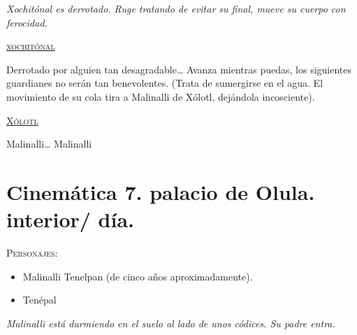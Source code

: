 \documentclass[11pt,letterpaper]{article}
\begin{document}
\textit{Xochitónal es derrotado. Ruge tratando de evitar su final, mueve su cuerpo con ferocidad. }

\begin{center}
\textsc{\underline{xochitónal}}
\\
\par
Derrotado por alguien tan desagradable… Avanza mientras puedas, los siguientes guardianes no serán tan benevolentes. (Trata de sumergirse en el agua. El movimiento de su cola tira a Malinalli de Xólotl, dejándola incosciente).
\\
\par
\textsc{\underline{Xólotl}}
\\
\par
Malinalli… Malinalli
\end{center}

\section{Cinemática 7. palacio de Olula. interior/ día.}
\textsc{Personajes}:
\begin{itemize}
 \item Malinalli Tenelpan (de cinco años aproximadamente).
	\item Tenépal
\end{itemize}

\textit{Malinalli está durmiendo en el suelo al lado de unos códices. Su padre entra.} 
\end{document}
